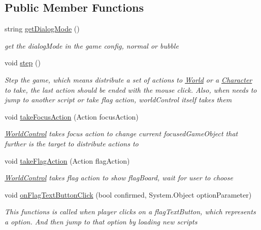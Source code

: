\subsection*{Public Member Functions}
\begin{DoxyCompactItemize}
\item 
string \hyperlink{class_world_control_aba054b4e4ce0dcf98b09d048cf602b1b}{get\+Dialog\+Mode} ()
\begin{DoxyCompactList}\small\item\em get the dialog\+Mode in the game config, normal or bubble \end{DoxyCompactList}\item 
void \hyperlink{class_world_control_aae50af1c8330aed4910b860be14396cf}{step} ()
\begin{DoxyCompactList}\small\item\em Step the game, which means distribute a set of actions to \hyperlink{class_world}{World} or a \hyperlink{class_character}{Character} to take, the last action should be ended with the mouse click. Also, when needs to jump to another script or take flag action, world\+Control itself takes them \end{DoxyCompactList}\item 
void \hyperlink{class_world_control_a4b63c9145e7046796385126835c65bc6}{take\+Focus\+Action} (Action focus\+Action)
\begin{DoxyCompactList}\small\item\em \hyperlink{class_world_control}{World\+Control} takes focus action to change current focused\+Game\+Object that further is the target to distribute actions to \end{DoxyCompactList}\item 
void \hyperlink{class_world_control_a62f0eb06c643028cf4219a72df9117c5}{take\+Flag\+Action} (Action flag\+Action)
\begin{DoxyCompactList}\small\item\em \hyperlink{class_world_control}{World\+Control} takes flag action to show flag\+Board, wait for user to choose \end{DoxyCompactList}\item 
void \hyperlink{class_world_control_a27c03eb3cc7770560a69122ac3dd1ee5}{on\+Flag\+Text\+Button\+Click} (bool confirmed, System.\+Object option\+Parameter)
\begin{DoxyCompactList}\small\item\em This functions is called when player clicks on a flag\+Text\+Button, which represents a option. And then jump to that option by loading new scripts \end{DoxyCompactList}\item 

\end{DoxyCompactItemize}
